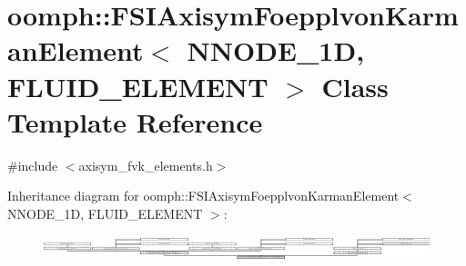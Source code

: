 \hypertarget{classoomph_1_1FSIAxisymFoepplvonKarmanElement}{}\section{oomph\+:\+:F\+S\+I\+Axisym\+Foepplvon\+Karman\+Element$<$ N\+N\+O\+D\+E\+\_\+1D, F\+L\+U\+I\+D\+\_\+\+E\+L\+E\+M\+E\+NT $>$ Class Template Reference}
\label{classoomph_1_1FSIAxisymFoepplvonKarmanElement}


{\ttfamily \#include $<$axisym\+\_\+fvk\+\_\+elements.\+h$>$}

Inheritance diagram for oomph\+:\+:F\+S\+I\+Axisym\+Foepplvon\+Karman\+Element$<$ N\+N\+O\+D\+E\+\_\+1D, F\+L\+U\+I\+D\+\_\+\+E\+L\+E\+M\+E\+NT $>$\+:\begin{figure}[H]
\begin{center}
\leavevmode
\includegraphics[height=0.744681cm]{classoomph_1_1FSIAxisymFoepplvonKarmanElement}
\end{center}
\end{figure}
